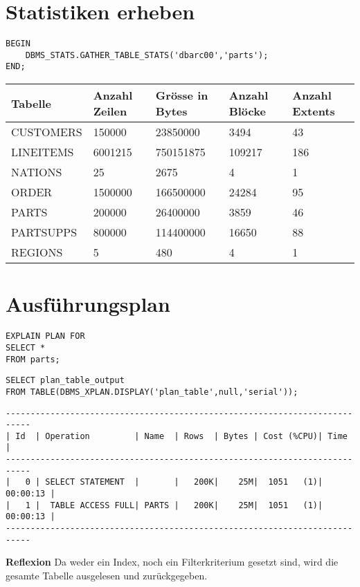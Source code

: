 \documentclass[10pt]{article}
\begin{document}
\section{Statistiken erheben}
\begin{lstlisting}[style=sql]
BEGIN
	DBMS_STATS.GATHER_TABLE_STATS('dbarc00','parts');
END;
\end{lstlisting}
{\normalsize
\begin{tabular}{|l|l|l|l|l|}
\hline
Tabelle & Anzahl Zeilen & Grösse in Bytes & Anzahl Blöcke & Anzahl Extents \\
\hline
\hline
CUSTOMERS & 150000 & 23850000 & 3494 & 43 \\
\hline
LINEITEMS & 6001215 & 750151875 & 109217 & 186 \\
\hline
NATIONS & 25 & 2675 & 4 & 1 \\
\hline
ORDER & 1500000 & 166500000 & 24284 &  95 \\
\hline
PARTS & 200000 & 26400000 & 3859 & 46 \\
\hline
PARTSUPPS & 800000 & 114400000 & 16650 & 88 \\
\hline
REGIONS & 5 & 480 & 4 & 1 \\
\hline
\end{tabular}
}


\section{Ausführungsplan}
\begin{lstlisting}[style=sql]
EXPLAIN PLAN FOR
SELECT *
FROM parts;
\end{lstlisting}
\begin{lstlisting}[style=sql]
SELECT plan_table_output
FROM TABLE(DBMS_XPLAN.DISPLAY('plan_table',null,'serial'));
\end{lstlisting}
\begin{lstlisting}[style=queryexecutionplan]
---------------------------------------------------------------------------
| Id  | Operation         | Name  | Rows  | Bytes | Cost (%CPU)| Time     |
---------------------------------------------------------------------------
|   0 | SELECT STATEMENT  |       |   200K|    25M|  1051   (1)| 00:00:13 |
|   1 |  TABLE ACCESS FULL| PARTS |   200K|    25M|  1051   (1)| 00:00:13 |
---------------------------------------------------------------------------
\end{lstlisting}
\textbf{Reflexion} \newline
Da weder ein Index, noch ein Filterkriterium gesetzt sind, wird die gesamte Tabelle ausgelesen und zurückgegeben.
\end{document}
